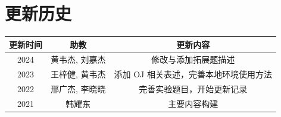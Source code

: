 \documentclass[12pt,a4paper]{article}
\begin{document}
\section*{更新历史}

\begin{center}
    \begin{tabular}{|c|c|c|}
        \hline
        \textbf{更新时间} & \textbf{助教} & \textbf{更新内容} \\
        \hline
        2024 & 黄韦杰, 刘嘉杰 & 修改与添加拓展题描述\\
        2023 & 王梓健, 黄韦杰 & 添加 OJ 相关表述，完善本地环境使用方法 \\
        2022 & 邢广杰, 李晓晓 & 完善实验题目，开始更新记录 \\
        2021 & 韩耀东 & 主要内容构建 \\
        \hline
        \end{tabular}
\end{center}
\end{document}
